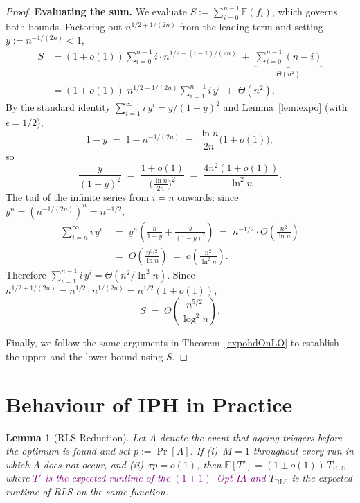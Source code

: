 \documentclass[lettersize,journal]{IEEEtran}
\newcommand{\rerev}[1]{\textcolor{purple}{#1}}
\newcommand{\EE}{\mathbb{E}}
\newcommand{\oneoneOPTIA}{$(1+1)$~Opt-IA}
\newtheorem{lemma}{Lemma}
\begin{document}
\begin{proof}
\medskip
\noindent\textbf{Evaluating the sum.}
We evaluate $S := \sum_{i=0}^{n-1} \EE(f_i)$, which governs both bounds.
Factoring out $n^{1/2+1/(2n)}$ from the leading term and setting
$y:=n^{-1/(2n)}<1$,
\begin{align*}
S
&= (1\pm o(1))\sum_{i=0}^{n-1} i\cdot n^{1/2-(i-1)/(2n)}
   \;+\;\underbrace{\sum_{i=0}^{n-1}(n-i)}_{\Theta(n^2)} \\
&= (1\pm o(1))\;n^{1/2+1/(2n)}\sum_{i=1}^{n-1} i\,y^{i}
   \;+\;\Theta(n^2).
\end{align*}
By the standard identity $\sum_{i=1}^{\infty} i\,y^i = y/(1-y)^2$
and Lemma~\ref{lem:expo} (with $\epsilon=1/2$),
\[
1-y \;=\; 1 - n^{-1/(2n)}
    \;=\; \frac{\ln n}{2n}\bigl(1+o(1)\bigr),
\]
so
\[
\frac{y}{(1-y)^2}
\;=\; \frac{1+o(1)}{\bigl(\frac{\ln n}{2n}\bigr)^2}
\;=\; \frac{4n^2(1+o(1))}{\ln^2 n}.
\]
The tail of the infinite series from $i=n$ onwards:
since $y^n = (n^{-1/(2n)})^n = n^{-1/2}$,
\begin{align*}
\sum_{i=n}^{\infty} i\,y^i
\;&=\; y^n\!\left(\frac{n}{1-y}+\frac{y}{(1-y)^2}\right)
\;=\; n^{-1/2}\cdot O\!\left(\frac{n^2}{\ln n}\right)
\\\;&=\; O\!\left(\frac{n^{3/2}}{\ln n}\right)
\;=\; o\!\left(\frac{n^2}{\ln^2 n}\right).
\end{align*}
Therefore $\sum_{i=1}^{n-1} i\,y^{i} = \Theta(n^2/\ln^2 n)$.
Since $n^{1/2+1/(2n)} = n^{1/2}\cdot n^{1/(2n)} = n^{1/2}(1+o(1))$,
\begin{equation}\label{eq:S-expoHD}
S \;=\; \Theta\!\left(\frac{n^{5/2}}{\log^2 n}\right).
\end{equation}

Finally, we follow the same arguments in Theorem~\ref{expohdOnLO} to establish the upper and the lower bound using $S$.
\end{proof}




 	
 	\section{Behaviour of IPH in Practice}


\setcounter{lemma}{2}
\begin{lemma}[RLS Reduction]%
Let $A$ denote the event that ageing triggers before the optimum is found
and set $p:=\Pr[A]$.
If \emph{(i)}~$M=1$ throughout every run in which $A$ does not occur, and
\emph{(ii)}~$\tau p=o(1)$,
then $\EE[T']=(1\pm o(1))\,T_{\mathrm{RLS}}$,
where \rerev{$T'$ is the expected runtime of the \oneoneOPTIA{} and} $T_{\mathrm{RLS}}$ is the expected runtime of RLS
 on the same function.
\end{lemma}
\end{document}
